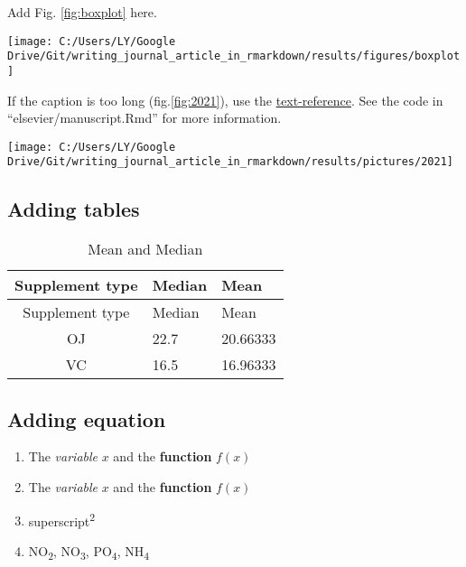 \documentclass[review]{elsarticle} %
\providecommand{\tightlist}{%
  \setlength{\itemsep}{0pt}\setlength{\parskip}{0pt}}
\let\origfigure\figure
\let\endorigfigure\endfigure
\renewenvironment{figure}[1][2] {
    \expandafter\origfigure\expandafter[H]
} {
    \endorigfigure
}
\begin{document}
Add Fig. \ref{fig:boxplot} here.

\begin{figure}

{\centering \texttt{[image: C:/Users/LY/Google Drive/Git/writing\_journal\_article\_in\_rmarkdown/results/figures/boxplot]} 

}

\caption{A boxplot}\label{fig:boxplot}
\end{figure}

If the caption is too long (fig.\ref{fig:2021}), use the
\href{https://bookdown.org/yihui/rmarkdown/bookdown-markdown.html\#text-references}{text-reference}.
See the code in ``elsevier/manuscript.Rmd'' for more information.



\begin{figure}

{\centering \texttt{[image: C:/Users/LY/Google Drive/Git/writing\_journal\_article\_in\_rmarkdown/results/pictures/2021]} 

}

\caption{This is a very long caption}\label{fig:2021}
\end{figure}

\subsection{Adding tables}\label{table}

\begin{longtable}[]{@{}cll@{}}
\caption{\label{tab:unnamed-chunk-2}\label{tab:cooltable}Mean and
Median}\tabularnewline
\toprule
Supplement type & Median & Mean\tabularnewline
\midrule
\endfirsthead
\toprule
Supplement type & Median & Mean\tabularnewline
\midrule
\endhead
OJ & 22.7 & 20.66333\tabularnewline
VC & 16.5 & 16.96333\tabularnewline
\bottomrule
\end{longtable}

\subsection{Adding equation}\label{equation}

\begin{enumerate}
\def\labelenumi{\arabic{enumi}.}
\tightlist
\item
  The \emph{variable} \(x\) and the \textbf{function} \(f(x)\)
\item
  The \emph{variable} \(x\) and the \textbf{function} \(f(x)\)
\item
  superscript\textsuperscript{2}
\item
  NO\textsubscript{2}, NO\textsubscript{3}, PO\textsubscript{4},
  NH\textsubscript{4}
\end{enumerate}
\end{document}
